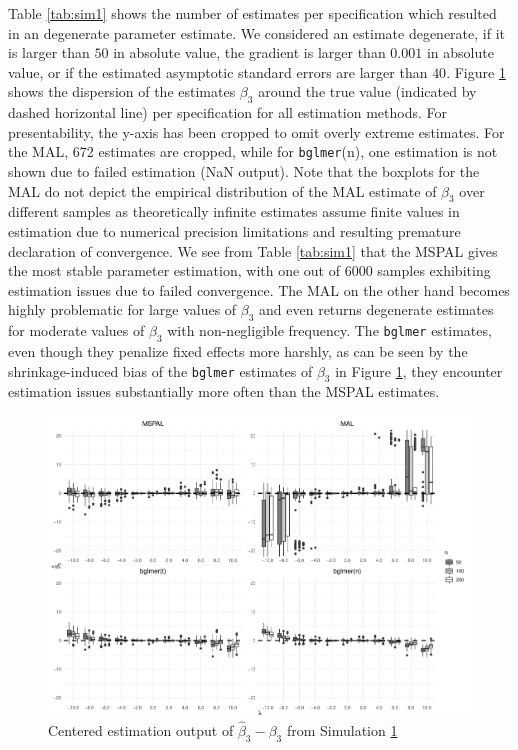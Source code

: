\documentclass[11pt, a4paper]{article}
\theoremstyle{example} \newtheorem{example}{Example}[section]
\theoremstyle{theorem} \newtheorem{theorem}{Theorem}[section]
\theoremstyle{theorem }\newtheorem{proposition}{Proposition}[section]
\theoremstyle{theorem }\newtheorem{corollary}{Corollary}[section]
\begin{document}
Table \ref{tab:sim1} shows the number of estimates per specification which resulted in an degenerate parameter estimate. We considered an estimate degenerate, if it is larger than $50$ in absolute value, the gradient is larger than $0.001$ in absolute value, or if the estimated asymptotic standard errors are larger than $40$. Figure \ref{fig:sim1} shows the dispersion of the estimates ${\beta}_3$ around the true value (indicated by dashed horizontal line) per specification for all estimation methods. For presentability, the y-axis has been cropped to omit overly extreme estimates. For the MAL, 672 estimates are cropped, while  for \texttt{bglmer}(n), one estimation is not shown due to failed estimation (NaN output). Note that the boxplots for the MAL do not depict the empirical distribution of the MAL estimate of $\beta_3$ over different samples as theoretically infinite estimates assume finite values in estimation due to numerical precision limitations and resulting premature declaration of convergence. We see from Table \ref{tab:sim1} that the MSPAL gives the most stable parameter estimation, with one out of 6000 samples exhibiting estimation issues due to failed convergence. The MAL on the other hand becomes highly problematic for large values of $\beta_3$ and even returns degenerate estimates for moderate values of $\beta_3$ with non-negligible frequency. The \texttt{bglmer} estimates, even though they penalize fixed effects more harshly, as can be seen by the shrinkage-induced bias of the \texttt{bglmer} estimates of $\beta_3$ in Figure \ref{fig:sim1}, they encounter estimation issues substantially more often than the MSPAL estimates. 
\begin{figure}[H]
	\begin{center}
		\includegraphics[width=\textwidth]{Figures/sim1.pdf}
	\end{center}
	\caption{Centered estimation output of $\hat{\beta}_3-\beta_3$ from Simulation \hyperref[sec:sim1]{1}}
	\label{fig:sim1}
\end{figure}
\end{document}
